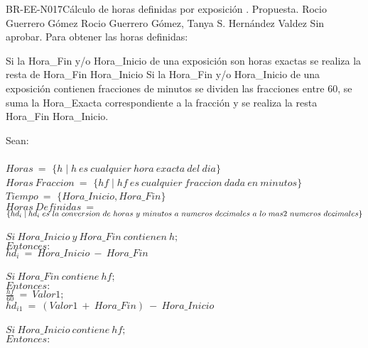 \begin{BusinessRule}{BR-EE-N017}{Cálculo de horas definidas por exposición}
	{\bcCondition}    %
	{\btEnabler}     %
	{\blControlling}    %
	.
	\BRItem[Estado] Propuesta.
	 Rocio Guerrero Gómez
	 Rocio Guerrero Gómez, Tanya S. Hernández Valdez
	 Sin aprobar.
	\BRItem[Descripción] Para obtener las horas definidas: \\
	\begin{Titemize}
		\Titem Si la Hora\_Fin y/o Hora\_Inicio de una exposición son horas exactas se realiza la resta de Hora\_Fin \- Hora\_Inicio 
		\Titem Si la Hora\_Fin y/o Hora\_Inicio de una exposición contienen fracciones de minutos se dividen las fracciones entre 60, se suma la Hora\_Exacta correspondiente a la fracción y se realiza la resta Hora\_Fin \- Hora\_Inicio.
	\end{Titemize}
	\BRItem[Sentencia] Sean: \\\\
	$Horas\ =$ $\{h \mid h\ es\ cualquier\ hora\ exacta\ del\ dia\}$ \\
	$Horas\ Fraccion\ =$ $\{hf \mid hf\ es\ cualquier\ fraccion\ dada\ en\ minutos\}$\\
	$Tiempo\ =$ $\{Hora\_Inicio, Hora\_Fin\}$ \\
	$Horas\ Definidas\ =$ $\{hd_i \mid hd_i\ es\ la\ conversion\ de\ horas\ y\ minutos\ a\ numeros\ decimales\ a\ lo\ mas\\ 2\ numeros\ decimales\}$\\\\
	$Si\ Hora\_Inicio\ y\ Hora\_Fin\ contienen\ h;$\\
	$Entonces:$\\
	$hd_i\ =\ Hora\_Inicio\ -\ Hora\_Fin$\\\\
	$Si\ Hora\_Fin\ contiene\ hf;$\\
	$Entonces:$ \\
	$\frac{hf}{60}\ =\ Valor1;$ \\ $hd_{i1}\ =\ (Valor1\ +\ Hora\_Fin)\ -\ Hora\_Inicio$ \\\\
	$Si\ Hora\_Inicio\ contiene\ hf;$\\
	$Entonces:$ \\

\end{BusinessRule}
